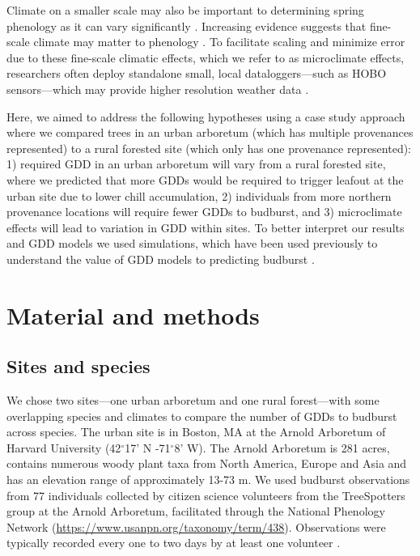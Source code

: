 \documentclass{article}\usepackage[]{graphicx}\usepackage[]{color}
\begin{document}
Climate on a smaller scale may also be important to determining spring phenology as it can vary significantly \citep[e.g., as much as 2.6$^{\circ}$C between sensors at the same site or up to 6.6$^{\circ}$C within 1 km spatial units in northern Europe,][]{Lenoir2013,deResseguier2020}. Increasing evidence suggests that fine-scale climate may matter to phenology \citep{Lembrechts2019,Laigle2021}. To facilitate scaling and minimize error due to these fine-scale climatic effects, which we refer to as microclimate effects, researchers often deploy standalone small, local dataloggers---such as HOBO sensors---which may provide higher resolution weather data \citep{Schwartz2013a,Whiteman2000}.  
 
Here, we aimed to address the following hypotheses using a case study approach where we compared trees in an urban arboretum (which has multiple provenances represented) to a rural forested site (which only has one provenance represented): 1) required GDD in an urban arboretum will vary from a rural forested site, where we predicted that more GDDs would be required to trigger leafout at the urban site due to lower chill accumulation, 2) individuals from more northern provenance locations will require fewer GDDs to budburst, and 3) microclimate effects will lead to variation in GDD within sites. To better interpret our results and GDD models we used simulations, which have been used previously to understand the value of GDD models to predicting budburst \citep[e.g.,][]{Hunter1992}.

\section{Material and methods}
\subsection{Sites and species}
We chose two sites---one urban arboretum and one rural forest---with some overlapping species and climates to compare the number of GDDs to budburst across species. The urban site is in Boston, MA at the Arnold Arboretum of Harvard University (42$^{\circ}$17' N -71$^{\circ}$8' W). The Arnold Arboretum is 281 acres, contains numerous woody plant taxa from North America, Europe and Asia and has an elevation range of approximately 13-73 m. We used budburst observations \citep[i.e., defined as the `beginning of sprouting or bud breaking; shoot emergence' as BBCH scale 07][]{Finn2007} from 77 individuals collected by citizen science volunteers from the TreeSpotters group at the Arnold Arboretum, facilitated through the National Phenology Network (\url{https://www.usanpn.org/taxonomy/term/438}). Observations were typically recorded every one to two days by at least one volunteer \citep{Denny2014}.
\end{document}
